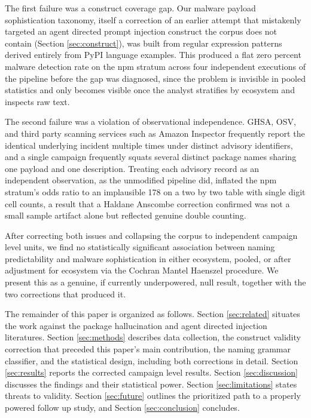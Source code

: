 \documentclass[journal]{IEEEtran}
\begin{document}
The first failure was a construct coverage gap. Our malware payload sophistication taxonomy, itself a correction of an earlier attempt that mistakenly targeted an agent directed prompt injection construct the corpus does not contain (Section \ref{sec:construct}), was built from regular expression patterns derived entirely from PyPI language examples. This produced a flat zero percent malware detection rate on the npm stratum across four independent executions of the pipeline before the gap was diagnosed, since the problem is invisible in pooled statistics and only becomes visible once the analyst stratifies by ecosystem and inspects raw text.

The second failure was a violation of observational independence. GHSA, OSV, and third party scanning services such as Amazon Inspector frequently report the identical underlying incident multiple times under distinct advisory identifiers, and a single campaign frequently squats several distinct package names sharing one payload and one description. Treating each advisory record as an independent observation, as the unmodified pipeline did, inflated the npm stratum's odds ratio to an implausible 178 on a two by two table with single digit cell counts, a result that a Haldane Anscombe correction confirmed was not a small sample artifact alone but reflected genuine double counting.

After correcting both issues and collapsing the corpus to independent campaign level units, we find no statistically significant association between naming predictability and malware sophistication in either ecosystem, pooled, or after adjustment for ecosystem via the Cochran Mantel Haenszel procedure. We present this as a genuine, if currently underpowered, null result, together with the two corrections that produced it.

The remainder of this paper is organized as follows. Section \ref{sec:related} situates the work against the package hallucination and agent directed injection literatures. Section \ref{sec:methods} describes data collection, the construct validity correction that preceded this paper's main contribution, the naming grammar classifier, and the statistical design, including both corrections in detail. Section \ref{sec:results} reports the corrected campaign level results. Section \ref{sec:discussion} discusses the findings and their statistical power. Section \ref{sec:limitations} states threats to validity. Section \ref{sec:future} outlines the prioritized path to a properly powered follow up study, and Section \ref{sec:conclusion} concludes.
\end{document}
